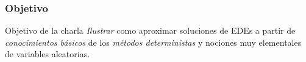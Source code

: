 \begin{frame}
	\frametitle{Objetivo}
	\begin{alertblock}{Objetivo de la charla}
		\emph{Ilustrar} como aproximar soluciones de EDEs  a partir de \emph{conocimientos básicos} 
		de los \emph{métodos deterministas} y nociones muy elementales de variables aleatorias.
	\end{alertblock}
\end{frame}
